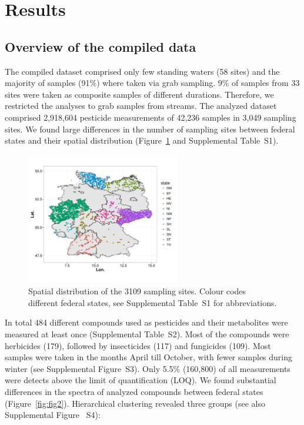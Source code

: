 \documentclass[journal=esthag,manuscript=article]{achemso}
\begin{document}
\section{Results}
\subsection{Overview of the compiled data}

The compiled dataset comprised only few standing waters (58 sites) and the majority of samples (91\%) where taken via grab sampling.  %
9\% of samples from 33 sites were taken as composite samples of different durations.
Therefore, we restricted the analyses to grab samples from streams. 
The analyzed dataset comprised 2,918,604 pesticide measurements of 42,236 samples in 3,049 sampling sites.  %
We found large differences in the number of sampling sites between federal states and their spatial distribution (Figure~\ref{fig:fig1} and Supplemental Table~S1).

\begin{figure}[ht]
  \includegraphics[width=0.6\textwidth]{figure1.pdf}
  \caption{Spatial distribution of the 3109 sampling sites. Colour codes different federal states, see Supplemental Table~S1 for abbreviations.}
  \label{fig:fig1}
\end{figure}

In total 484 different compounds used as pesticides and their metabolites were measured at least once (Supplemental Table~S2). 
Most of the compounds were herbicides (179), followed by insecticides (117) and fungicides (109).
Most samples were taken in the months April till October, with fewer samples during winter (see Supplemental Figure~S3).
Only 5.5\% (160,800) of all measurements were detects above the limit of quantification (LOQ).
We found substantial differences in the spectra of analyzed compounds between federal states (Figure~\ref{fig:fig2}).
Hierarchical clustering revealed three groups (see also Supplemental Figure~ S4):
\end{document}
